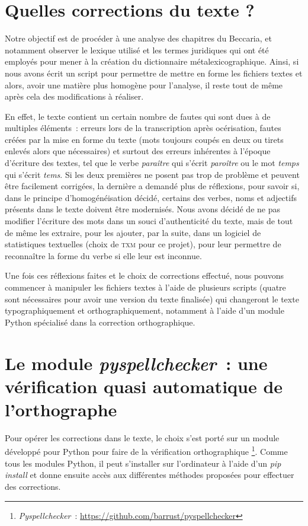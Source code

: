
\section{Quelles corrections du texte ?}
Notre objectif est de procéder à une analyse des chapitres du Beccaria, et notamment observer le lexique utilisé et les termes juridiques qui ont été employés pour mener à la création du dictionnaire métalexicographique. Ainsi, si nous avons écrit un script pour permettre de mettre en forme les fichiers textes et alors, avoir une matière plus homogène pour l'analyse, il reste tout de même après cela des modifications à réaliser.

En effet, le texte contient un certain nombre de fautes qui sont dues à de multiples éléments~: erreurs lors de la transcription après océrisation, fautes créées par la mise en forme du texte (mots toujours coupés en deux ou tirets enlevés alors que nécessaires) et surtout des erreurs inhérentes à l'époque d'écriture des textes, tel que le verbe \textit{paraître} qui s'écrit \textit{paroître} ou le mot \textit{temps} qui s'écrit \textit{tems}. Si les deux premières ne posent pas trop de problème et peuvent être facilement corrigées, la dernière a demandé plus de réflexions, pour savoir si, dans le principe d'homogénéisation décidé, certains des verbes, noms et adjectifs présents dans le texte doivent être modernisés. Nous avons décidé de ne pas modifier l'écriture des mots dans un souci d'authenticité du texte, mais de tout de même les extraire, pour les ajouter, par la suite, dans un logiciel de statistiques textuelles (choix de \textsc{txm} pour ce projet), pour leur permettre de reconnaître la forme du verbe si elle leur est inconnue.\pagebreak

Une fois ces réflexions faites et le choix de corrections effectué, nous pouvons commencer à manipuler les fichiers textes à l'aide de plusieurs scripts (quatre sont nécessaires pour avoir une version du texte finalisée) qui changeront le texte typographiquement et orthographiquement, notamment à l'aide d'un module Python spécialisé dans la correction orthographique.

\section{Le module \emph{pyspellchecker}~: une vérification quasi automatique de l'orthographe}
Pour opérer les corrections dans le texte, le choix s'est porté sur un module développé pour Python pour faire de la vérification orthographique \footnote{\emph{Pyspellchecker}~: \url{https://github.com/barrust/pyspellchecker}}. Comme tous les modules Python, il peut s'installer sur l'ordinateur à l'aide d'un \emph{pip install} et donne ensuite accès aux différentes méthodes proposées pour effectuer des corrections.

